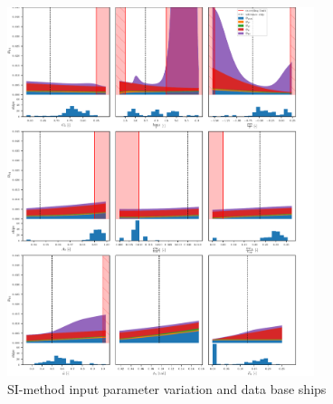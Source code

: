 \begin{figure}[H]
    \centering
    \includegraphics[width=0.8\textwidth]{figures/SI-sensitivity.pdf}
        \vspace{-0.1cm}
    \caption{SI-method input parameter variation and data base ships}
    \label{fig:SI_sensitivity}
\end{figure}
